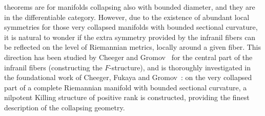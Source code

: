 \documentclass[10pt,a4paper]{amsart}
\numberwithin{equation}{section}
\begin{document}
theorems are for manifolds collapsing also with bounded diameter, and they are
in the differentiable category. However, due to the existence of abundant local
symmetries for those very collapsed manifolds with bounded sectional curvature,
it is natural to wonder if the extra symmetry provided by the infranil fibers
can be reflected on the level of Riemannian metrics, locally around a given
fiber. This direction has been studied by Cheeger and Gromov~\cite{CGI, CGII}
for the central part of the infranil fibers (constructing the $F$-structure),
and is thoroughly investigated in the foundational work of Cheeger, Fukaya and
Gromov~\cite{CFG92}: on the very collapsed part of a complete Riemannian
manifold with bounded sectional curvature, a nilpotent Killing structure of
positive rank is constructed, providing the finest description of the
collapsing geometry.
\end{document}
